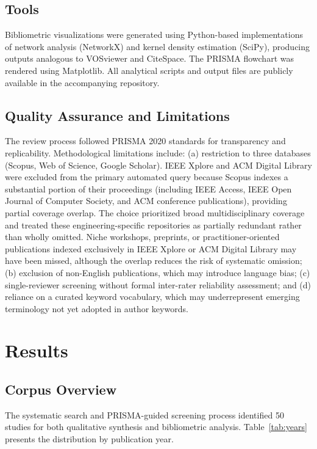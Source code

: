 \documentclass[conference]{IEEEtran}
\begin{document}
\subsection{Tools}

Bibliometric visualizations were generated using Python-based implementations of network analysis (NetworkX) and kernel density estimation (SciPy), producing outputs analogous to VOSviewer and CiteSpace. The PRISMA flowchart was rendered using Matplotlib. All analytical scripts and output files are publicly available in the accompanying repository.

\subsection{Quality Assurance and Limitations}

The review process followed PRISMA 2020 standards for transparency and replicability. Methodological limitations include: (a) restriction to three databases (Scopus, Web of Science, Google Scholar). IEEE Xplore and ACM Digital Library were excluded from the primary automated query because Scopus indexes a substantial portion of their proceedings (including IEEE Access, IEEE Open Journal of Computer Society, and ACM conference publications), providing partial coverage overlap. The choice prioritized broad multidisciplinary coverage and treated these engineering-specific repositories as partially redundant rather than wholly omitted. Niche workshops, preprints, or practitioner-oriented publications indexed exclusively in IEEE Xplore or ACM Digital Library may have been missed, although the overlap reduces the risk of systematic omission; (b) exclusion of non-English publications, which may introduce language bias; (c) single-reviewer screening without formal inter-rater reliability assessment; and (d) reliance on a curated keyword vocabulary, which may underrepresent emerging terminology not yet adopted in author keywords.

\section{Results}

\subsection{Corpus Overview}

The systematic search and PRISMA-guided screening process identified 50 studies for both qualitative synthesis and bibliometric analysis. Table~\ref{tab:years} presents the distribution by publication year.
\end{document}

